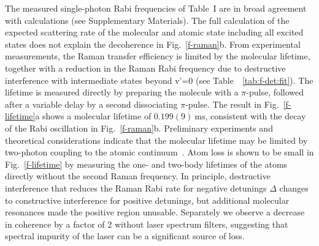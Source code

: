\documentclass[aps,prl,twocolumn,10pt,superscriptaddress]{revtex4-1}
\newcommand{\todo}[1]{}
\newcounter{TRC}
\newcommand{\TR}[1]{\textcolor{violet}{[[\stepcounter{TRC} TR\arabic{TRC}: #1]]}}
\begin{document}
The measured single-photon Rabi frequencies of Table~I are in broad agreement with calculations (see Supplementary Materials).
The full calculation of the expected scattering rate of the molecular and atomic state including all excited states does not explain the decoherence in Fig.~\ref{f-raman}b.
From experimental measurements, the Raman transfer efficiency is limited by the molecular lifetime, together with a reduction in the Raman Rabi frequency due to destructive interference with intermediate states beyond v'=0 (see Table~~\ref{tab:f-det:fit}).
The lifetime is measured directly by preparing the molecule with a $\pi$-pulse,
followed after a variable delay by a second dissociating $\pi$-pulse.
The result in Fig.~\ref{f-lifetime}a shows a molecular lifetime of $0.199(9)~\mathrm{ms}$,
consistent with the decay of the Rabi oscillation in Fig.~\ref{f-raman}b.
Preliminary experiments and theoretical considerations indicate that the molecular lifetime may be limited by two-photon coupling to the atomic continuum~\cite{YichaoYu}.  Atom loss is shown to be small in Fig.~\ref{f-lifetime} by measuring the one- and
two-body lifetimes of the atoms directly without the second Raman frequency.  In principle, destructive interference that reduces the Raman Rabi rate for negative detunings $\Delta$ changes to constructive interference for positive detunings, but additional molecular resonances made the positive region unusable.  Separately we observe a decrease in coherence by a factor of 2 without laser spectrum filters,
suggesting that spectral impurity of the laser can be a significant source of loss.
\end{document}
